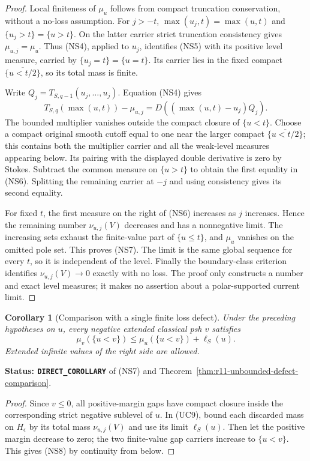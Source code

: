 \documentclass[11pt,a4paper]{article}
\numberwithin{equation}{section}
\newtheorem{corollary}[theorem]{Corollary}
\theoremstyle{definition}
\theoremstyle{remark}
\begin{document}
\begin{proof}
Local finiteness of $\mu_u$ follows from compact truncation
conservation, without a no-loss assumption. For $j>-t$,
$\max(u_j,t)=\max(u,t)$ and $\{u_j>t\}=\{u>t\}$.
On the latter carrier strict truncation consistency gives
$\mu_{u,j}=\mu_u$. Thus (NS4), applied to $u_j$, identifies
(NS5) with its positive level measure, carried by
$\{u_j=t\}=\{u=t\}$. Its carrier lies in the fixed compact
$\overline{\{u<t/2\}}$, so its total mass is finite.

Write $Q_j=T_{S,q-1}(u_j,\ldots,u_j)$. Equation (NS4) gives
\[
 T_{S,q}(\max(u,t))-\mu_{u,j}
                   =D((\max(u,t)-u_j)Q_j).
\]
The bounded multiplier vanishes outside the compact closure of
$\{u<t\}$. Choose a compact original smooth cutoff equal to one
near the larger compact $\overline{\{u<t/2\}}$; this contains
both the multiplier carrier and all the weak-level measures
appearing below. Its pairing with the displayed double derivative
is zero by Stokes.
Subtract the common measure on $\{u>t\}$ to obtain the first
equality in (NS6). Splitting the remaining carrier at $-j$
and using consistency gives its second equality.

For fixed $t$, the first measure on the right of (NS6)
increases as $j$ increases. Hence the remaining number
$\nu_{u,j}(V)$ decreases and has a nonnegative limit. The
increasing sets exhaust the finite-value part of $\{u\leq t\}$,
and $\mu_u$ vanishes on the omitted pole set. This proves
(NS7). The limit is the same global sequence for every $t$,
so it is independent of the level. Finally the boundary-class
criterion identifies $\nu_{u,j}(V)\to0$ exactly with no loss.
The proof only constructs a number and exact level measures;
it makes no assertion about a polar-supported current limit.
\end{proof}

\begin{corollary}[Comparison with a single finite loss defect]
\label{cor:r11-comparison-scalar-loss}
Under the preceding hypotheses on $u$, every negative extended
classical psh $v$ satisfies
\[
          \mu_v(\{u<v\})
                    \leq\mu_u(\{u<v\})+\ell_S(u).
 \tag{NS8}
\]
Extended infinite values of the right side are allowed.
\end{corollary}

\noindent\textbf{Status: \texttt{DIRECT\_COROLLARY}} of
(NS7) and Theorem~\ref{thm:r11-unbounded-defect-comparison}.

\begin{proof}
Since $v\leq0$, all positive-margin gaps have compact closure
inside the corresponding strict negative sublevel of $u$.
In (UC9), bound each discarded mass on $H_\epsilon$ by its
total mass $\nu_{u,j}(V)$ and use its limit $\ell_S(u)$.
Then let the positive margin decrease to zero; the two
finite-value gap carriers increase to $\{u<v\}$. This gives
(NS8) by continuity from below.
\end{proof}
\end{document}
